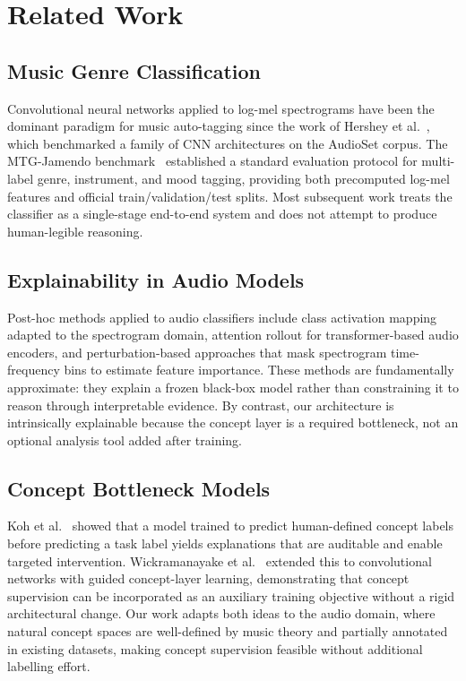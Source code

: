 \documentclass[sigconf,nonacm]{acmart}
\begin{document}
\section{Related Work}

\subsection{Music Genre Classification}

Convolutional neural networks applied to log-mel spectrograms have been the dominant paradigm
for music auto-tagging since the work of Hershey et al.~\cite{hershey2017cnn}, which
benchmarked a family of CNN architectures on the AudioSet corpus. The MTG-Jamendo
benchmark~\cite{bogdanov2019mtg} established a standard evaluation protocol for multi-label
genre, instrument, and mood tagging, providing both precomputed log-mel features and official
train/validation/test splits. Most subsequent work treats the classifier as a single-stage
end-to-end system and does not attempt to produce human-legible reasoning.

\subsection{Explainability in Audio Models}

Post-hoc methods applied to audio classifiers include class activation mapping adapted to the
spectrogram domain, attention rollout for transformer-based audio encoders, and
perturbation-based approaches that mask spectrogram time-frequency bins to estimate feature
importance. These methods are fundamentally approximate: they explain a frozen black-box model
rather than constraining it to reason through interpretable evidence. By contrast, our
architecture is intrinsically explainable because the concept layer is a required bottleneck,
not an optional analysis tool added after training.

\subsection{Concept Bottleneck Models}

Koh et al.~\cite{koh2020concept} showed that a model trained to predict human-defined concept
labels before predicting a task label yields explanations that are auditable and enable targeted
intervention. Wickramanayake et al.~\cite{wickramanayake2021comprehensible} extended this to
convolutional networks with guided concept-layer learning, demonstrating that concept supervision
can be incorporated as an auxiliary training objective without a rigid architectural change.
Our work adapts both ideas to the audio domain, where natural concept spaces are well-defined
by music theory and partially annotated in existing datasets, making concept supervision
feasible without additional labelling effort.
\end{document}
